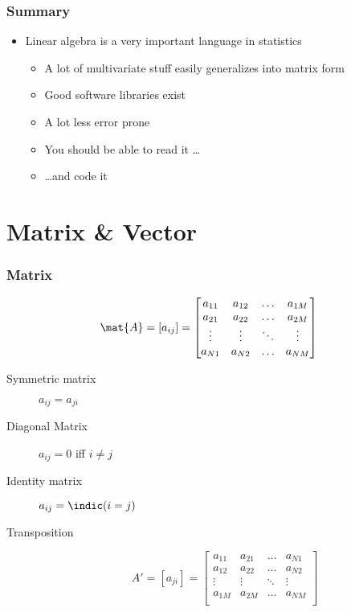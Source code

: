 \documentclass[mathserif, xcolor=table, svgnames]{beamer}
\begin{document}
\begin{frame}
  \frametitle{Summary}
  \begin{itemize}
  \item Linear algebra is a very important language in statistics
    \begin{itemize}
    \item A lot of multivariate stuff easily generalizes into matrix form
    \item Good software libraries exist
    \item A lot less error prone
    \item You should be able to read it \dots
    \item \dots and code it
    \end{itemize}
  \end{itemize}
\end{frame}

\section{Matrix \& Vector}

\begin{frame}
  \frametitle{Matrix}
  \begin{equation*}
    \mat{A} 
    = [ a_{ij} ]
    =
    \begin{bmatrix}
      a_{11} & a_{12} & \dots & a_{1M}\\
      a_{21} & a_{22} & \dots & a_{2M}\\
      \vdots & \vdots & \ddots & \vdots \\
      a_{N1} & a_{N2} & \dots & a_{NM}\\
    \end{bmatrix}
  \end{equation*}
  \begin{description}
  \item[Symmetric matrix] $a_{ij} = a_{ji}$
  \item[Diagonal Matrix] $a_{ij} = 0$ iff $i \not = j$
  \item[Identity matrix] $a_{ij} = \indic(i = j)$
  \item[Transposition] 
    \begin{equation*}
      A' = [a_{ji}] =
      \begin{bmatrix}
        a_{11} & a_{21} & \dots & a_{N1}\\
        a_{12} & a_{22} & \dots & a_{N2}\\
        \vdots & \vdots & \ddots & \vdots \\
        a_{1M} & a_{2M} & \dots & a_{NM}\\
      \end{bmatrix}
    \end{equation*}
  \end{description}
\end{frame}
\end{document}
